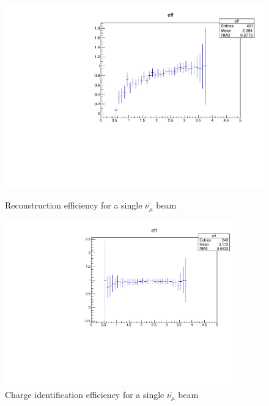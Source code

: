 \begin{figure}[h!]
	\begin{minipage}{0.49\linewidth}
		\centerline{\includegraphics[width=0.9\linewidth]{figures/antimuNeutrinoFitted.pdf}}
			\caption[]{Reconstruction efficiency for a single $\bar{\nu_{\mu}}$ beam}
		\label{fig:antinumufitted}
	\end{minipage}
	\hfill
	\begin{minipage}{0.49\linewidth}
		\centerline{\includegraphics[width=0.9\textwidth]{figures/antimuNeutrinochargeID.pdf}}
		\caption[]{Charge identification efficiency for a single $\bar{\nu_{\mu}}$ beam}
		\label{fig:antinumucharge}
	\end{minipage}
\end{figure}

